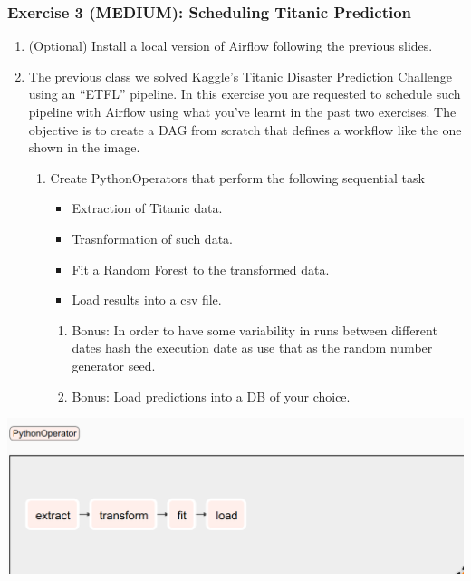 \documentclass[leqno, 10pt, envcountsect]{beamer}
\numberwithin{equation}{section}
\theoremstyle{definition}
\theoremstyle{example}
\numberwithin{figure}{section}
\numberwithin{table}{section}
\let\olditem\item
\renewcommand{\item}{%
\olditem\vspace{1pt}}
\begin{document}
\begin{frame}[fragile=singleslide]
  \frametitle{Exercise 3 (MEDIUM): Scheduling Titanic Prediction}
  \begin{enumerate}
    \item (Optional) Install a local version of Airflow following the previous
      slides.
    \item The previous class we solved Kaggle's Titanic Disaster Prediction
      Challenge using an \enquote{ETFL} pipeline. In this exercise you are
      requested to schedule such pipeline with Airflow using what you've learnt
      in the past two exercises. The objective is to create a DAG from scratch
      that defines a workflow like the one shown in the image.
    \begin{enumerate}
      \item Create PythonOperators that perform the following sequential task
        \begin{itemize}
          \item Extraction of Titanic data.
          \item Trasnformation of such data.
          \item Fit a Random Forest to the transformed data.
          \item Load results into a csv file.
        \end{itemize}
    \begin{enumerate}
          \item Bonus: In order to have some variability in runs between different
            dates hash the execution date as use that as the random number
            generator seed.
          \item Bonus: Load predictions into a DB of your choice.
        \end{enumerate}
      \end{enumerate}
      \end{enumerate}
  \begin{center}
    \includegraphics[scale=0.2]{exercise_3.png}
  \end{center}
\end{frame}
\end{document}
